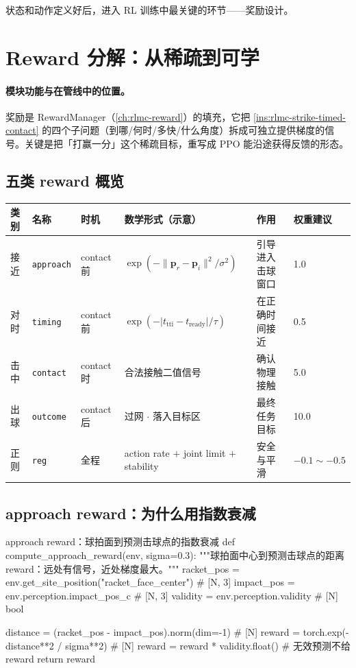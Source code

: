 \noindent{}状态和动作定义好后，进入 RL 训练中最关键的环节——奖励设计。

\section{Reward 分解：从稀疏到可学}
\label{sec:rlmc-strike-reward}

\paragraph{模块功能与在管线中的位置。}奖励是 RewardManager（\cref{ch:rlmc-reward}）的填充，它把 \cref{ins:rlmc-strike-timed-contact} 的四个子问题（到哪/何时/多快/什么角度）拆成可独立提供梯度的信号。关键是把「打赢一分」这个稀疏目标，重写成 PPO 能沿途获得反馈的形态。

\subsection{五类 reward 概览}

\begin{center}
\small
\begin{tabular}{@{}llllll@{}}
\toprule
类别 & 名称 & 时机 & 数学形式（示意） & 作用 & 权重建议 \\
\midrule
接近 & \verb|approach| & contact 前 & $\exp(-\lVert\mathbf{p}_r-\mathbf{p}_i\rVert^2/\sigma^2)$ & 引导进入击球窗口 & 1.0 \\
对时 & \verb|timing| & contact 前 & $\exp(-\lvert t_{\text{tti}}-t_{\text{ready}}\rvert/\tau)$ & 在正确时间接近 & 0.5 \\
击中 & \verb|contact| & contact 时 & 合法接触二值信号 & 确认物理接触 & 5.0 \\
出球 & \verb|outcome| & contact 后 & 过网 $\cdot$ 落入目标区 & 最终任务目标 & 10.0 \\
正则 & \verb|reg| & 全程 & action rate $+$ joint limit $+$ stability & 安全与平滑 & $-0.1\sim-0.5$ \\
\bottomrule
\end{tabular}
\end{center}

\subsection{approach reward：为什么用指数衰减}

\begin{codebox}[Python]{approach reward：球拍面到预测击球点的指数衰减}
def compute_approach_reward(env, sigma=0.3):
    """球拍面中心到预测击球点的距离 reward：远处有信号，近处梯度最大。"""
    racket_pos = env.get_site_position("racket_face_center")  # [N, 3]
    impact_pos = env.perception.impact_pos_c                  # [N, 3]
    validity = env.perception.validity                        # [N] bool

    distance = (racket_pos - impact_pos).norm(dim=-1)         # [N]
    reward = torch.exp(-distance**2 / sigma**2)               # [N]
    reward = reward * validity.float()    # 无效预测不给 reward
    return reward
\end{codebox}

